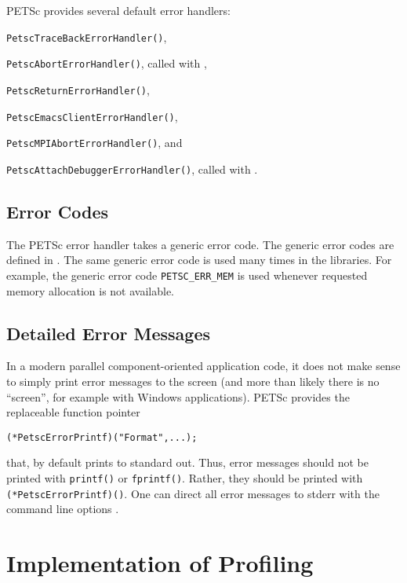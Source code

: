 PETSc provides several default error handlers:
\begin{tightitemize}
  \item \lstinline{PetscTraceBackErrorHandler()}, 
  \item \lstinline{PetscAbortErrorHandler()}, called with ,
  \item \lstinline{PetscReturnErrorHandler()},
  \item \lstinline{PetscEmacsClientErrorHandler()}, 
  \item \lstinline{PetscMPIAbortErrorHandler()}, and
  \item \lstinline{PetscAttachDebuggerErrorHandler()}, called with .
\end{tightitemize}

\subsection{Error Codes}

The PETSc error handler takes a generic error code.
The generic error codes are defined in
\href{http://www.mcs.anl.gov/petsc/petsc-master/include/petscerror.h.html}{}. 
The same generic error code is used many times in the libraries. 
For example, the generic error code \lstinline{PETSC_ERR_MEM} is used whenever requested memory allocation is not available.

\subsection{Detailed Error Messages}
In a modern parallel component-oriented application code, it does not make sense
to simply print error messages to the screen (and more than likely there is no
``screen'', for example with Windows applications).
PETSc provides the replaceable function pointer
\begin{lstlisting}
(*PetscErrorPrintf)("Format",...);
\end{lstlisting}
that, by default prints to standard out. Thus, error messages should not
be printed with \lstinline{printf()} or \lstinline{fprintf()}. 
Rather, they should be printed with
\lstinline{(*PetscErrorPrintf)()}. 
One can direct all error messages to stderr with the command line options .


\section{Implementation of Profiling}
\label{sec:profimpl}

